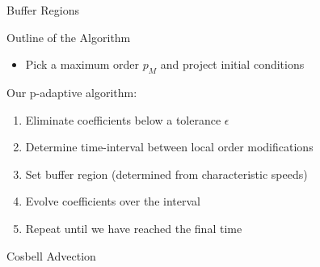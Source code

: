 \documentclass[sansserif]{beamer}
\begin{document}
\begin{frame}{Buffer Regions}
\end{frame}

\begin{frame}{Outline of the Algorithm}
\begin{itemize}
 \item<1->[] Pick a maximum order $p_M$ and project initial conditions
\end{itemize}
Our p-adaptive algorithm:
\begin{enumerate}
 \item<2-> Eliminate coefficients below a tolerance $\epsilon$
 \item<3-> Determine time-interval between local order modifications
 \item<3-> Set buffer region (determined from characteristic speeds)
 \item<4-> Evolve coefficients over the interval
 \item<5-> Repeat until we have reached the final time
\end{enumerate}
\end{frame}

\begin{frame}{Cosbell Advection}
\vspace{-0.7cm}
\begin{center}
\end{center}
\end{frame}
\end{document}
